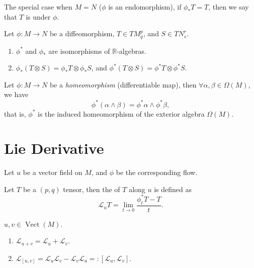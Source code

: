 \documentclass[openany, oneside, a5paper]{book}
\DeclareMathOperator{\Vect}{Vect}
\begin{document}
The special case when $M = N$ ($\phi$ is an endomorphism), if $\phi_*T = T$, then we say that $T$ is  under $\phi$.

\begin{theorem}
    Let $\phi \colon M \to N$ be a diffeomorphism, $T \in TM^p_q$, and $S \in TN^r_s$.
    \begin{enumerate}
        \item $\phi^*$ and $\phi_*$ are isomorphisms of $\mathbb R$-algebras.
        \item $\phi_* (T \otimes S) = \phi_* T \otimes \phi_*S$, and $\phi^* (T \otimes S) = \phi^* T \otimes \phi^*S$.
    \end{enumerate}
\end{theorem}

\begin{theorem}
    Let $\phi \colon M \to N$ be a \emph{homeomorphism} (differentiable map), then $\forall \alpha, \beta \in \Omega(M)$, we have
    \begin{equation}
        \phi^* (\alpha \wedge \beta) = \phi^* \alpha \wedge \phi^* \beta,
    \end{equation}
    that is, $\phi^*$ is the induced homeomorphism of the exterior algebra $\Omega(M)$.
\end{theorem}

\section{Lie Derivative}

Let $u$ be a vector field on $M$, and $\phi$ be the corresponding flow.

\begin{definition}
    Let $T$ be a $(p, q)$ tensor, then the  of $T$ along $u$ is defined as
    \begin{equation}\label{eq: lie derivative}
        \mathcal L_u T = \lim_{t \to 0} \frac{\phi^*_t T - T}{t}.
    \end{equation}
\end{definition}

\begin{theorem}
    $u, v \in \Vect(M)$.
    \begin{enumerate}
        \item $\mathcal L_{u + v} = \mathcal L_u + \mathcal L_v$.
        \item $\mathcal L_{[u, v]} = \mathcal L_u \mathcal L_v - \mathcal L_v \mathcal L_u =: [\mathcal L_u, \mathcal L_v]$.
    \end{enumerate}
\end{theorem}
\end{document}
